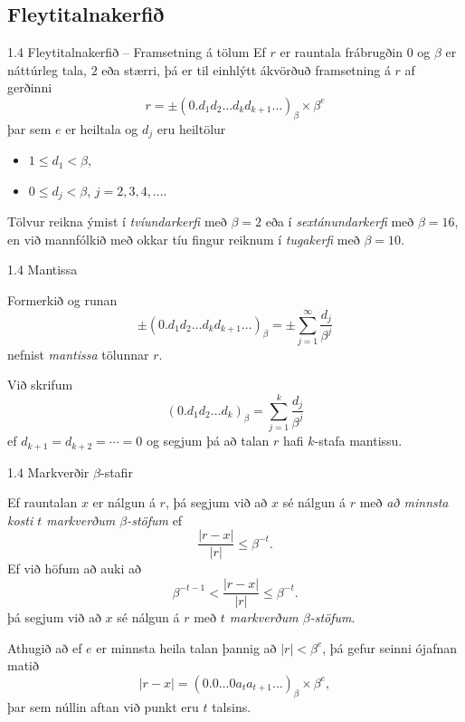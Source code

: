 \subsection{Fleytitalnakerfið}
\begin{frame}{1.4 Fleytitalnakerfið -- Framsetning á tölum} 
Ef $r$ er rauntala frábrugðin $0$ og $\beta$ er náttúrleg tala, $2$ eða stærri, þá er til einhlýtt ákvörðuð framsetning á $r$ af gerðinni 
\begin{equation*}
    r = 
    \pm (0.d_1d_2\dots d_kd_{k+1}\dots)_\beta\times \beta^e
\end{equation*}
þar sem $e$ er heiltala og $d_j$ eru heiltölur
\begin{itemize}
 \item  $1\leq d_1<\beta$, 
 \item $0\leq d_j<\beta$, $j=2,3,4,\dots$.
\end{itemize}
\pause

\smallskip

 Tölvur reikna ýmist í {\it tvíundarkerfi} með $\beta=2$ 
eða í {\it sextánundarkerfi} með $\beta=16$, en við mannfólkið með okkar 
tíu fingur reiknum í {\it tugakerfi} með $\beta=10$.
\end{frame}
%
%
\begin{frame}{1.4 Mantissa}

Formerkið og runan
\begin{equation*}
    \pm(0.d_1d_2\dots d_kd_{k+1}\dots)_\beta =
    \pm\sum_{j=1}^\infty \dfrac{d_j}{\beta^j}
\end{equation*}
nefnist {\it mantissa} tölunnar $r$. \pause

\smallskip

Við skrifum
\begin{equation*}
    (0.d_1d_2\dots d_k)_\beta = 
    \sum_{j=1}^k \dfrac{d_j}{\beta^j}
\end{equation*}
ef $d_{k+1} = d_{k+2} = \cdots = 0$ og segjum þá að talan $r$ hafi
$k$-stafa mantissu. 
\end{frame}
%
%
\begin{frame}{1.4 Markverðir $\beta$-stafir} 

Ef rauntalan $x$ er nálgun á $r$, þá segjum við að $x$ sé nálgun á 
$r$ með {\it að minnsta kosti $t$ markverðum $\beta$-stöfum} ef
\begin{equation*}
    \dfrac{|r-x|}{|r|}\leq \beta^{-t}.
\end{equation*}
\pause
Ef við höfum að auki að
\begin{equation*}
\beta^{-t-1}<\dfrac{|r-x|}{|r|}\leq \beta^{-t}.
\end{equation*}
þá segjum við að $x$ sé nálgun á $r$ með  {\it $t$ markverðum
$\beta$-stöfum}.

\pause
 Athugið að ef $e$ er minnsta heila talan þannig að $|r|<\beta^e$, 
þá gefur seinni ójafnan matið 
\begin{equation*}
    |r-x| = (0.0\dots 0a_ta_{t+1}\dots)_\beta \times \beta^e,
\end{equation*}
þar sem núllin aftan við punkt eru $t$ talsins.  

\end{frame}
